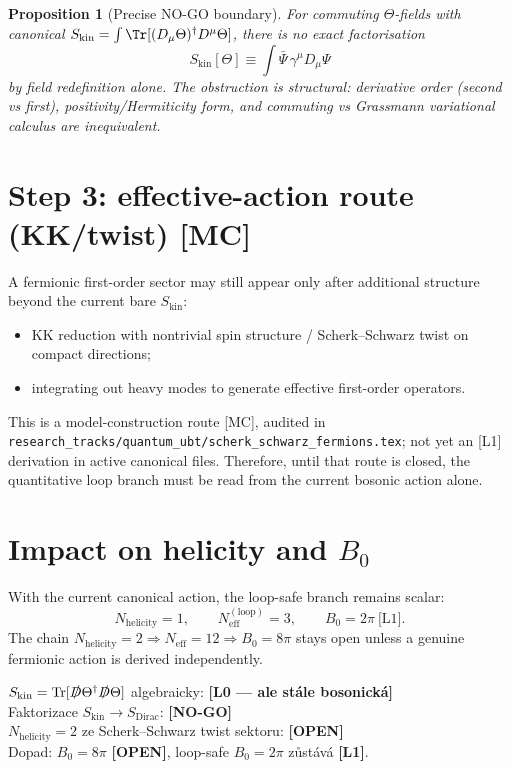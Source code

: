 \documentclass[12pt,a4paper]{article}
\newtheorem{proposition}{Proposition}[section]
\begin{document}
\begin{proposition}[Precise NO-GO boundary]
For commuting \(\Theta\)-fields with canonical
\(
S_{\mathrm{kin}}=\int\Tr[(D_\mu\Theta)^\dagger D^\mu\Theta]
\),
there is no exact factorisation
\[
S_{\mathrm{kin}}[\Theta]\equiv
\int \bar\Psi\,\gamma^\mu D_\mu\Psi
\]
by field redefinition alone.
The obstruction is structural: derivative order (second vs first), positivity/Hermiticity form,
and commuting vs Grassmann variational calculus are inequivalent.
\end{proposition}

\section{Step 3: effective-action route (KK/twist) [MC]}
A fermionic first-order sector may still appear only after additional structure
beyond the current bare \(S_{\mathrm{kin}}\):
\begin{itemize}
  \item KK reduction with nontrivial spin structure / Scherk--Schwarz twist on compact directions;
  \item integrating out heavy modes to generate effective first-order operators.
\end{itemize}
This is a model-construction route [MC], audited in
\texttt{research\_tracks/quantum\_ubt/scherk\_schwarz\_fermions.tex};
not yet an [L1] derivation in active canonical files.
Therefore, until that route is closed, the quantitative loop branch must be read from the current bosonic action alone.

\section{Impact on helicity and \(B_0\)}
With the current canonical action, the loop-safe branch remains scalar:
\[
N_{\mathrm{helicity}}=1,\qquad N_{\mathrm{eff}}^{(\mathrm{loop})}=3,\qquad B_0=2\pi\ \text{[L1]}.
\]
The chain
\(
N_{\mathrm{helicity}}=2\Rightarrow N_{\mathrm{eff}}=12\Rightarrow B_0=8\pi
\)
stays open unless a genuine fermionic action is derived independently.

\begin{statusbox}
$S_{\mathrm{kin}} = \mathrm{Tr}[\slashed{D}\Theta^\dagger\slashed{D}\Theta]$ algebraicky: \textbf{[L0 — ale stále bosonická]}\\
Faktorizace $S_{\mathrm{kin}}\rightarrow S_{\mathrm{Dirac}}$: \textbf{[NO-GO]}\\
$N_{\mathrm{helicity}}=2$ ze Scherk--Schwarz twist sektoru: \textbf{[OPEN]}\\
Dopad: $B_0=8\pi$ \textbf{[OPEN]}, loop-safe $B_0=2\pi$ zůstává \textbf{[L1]}.
\end{statusbox}
\end{document}
